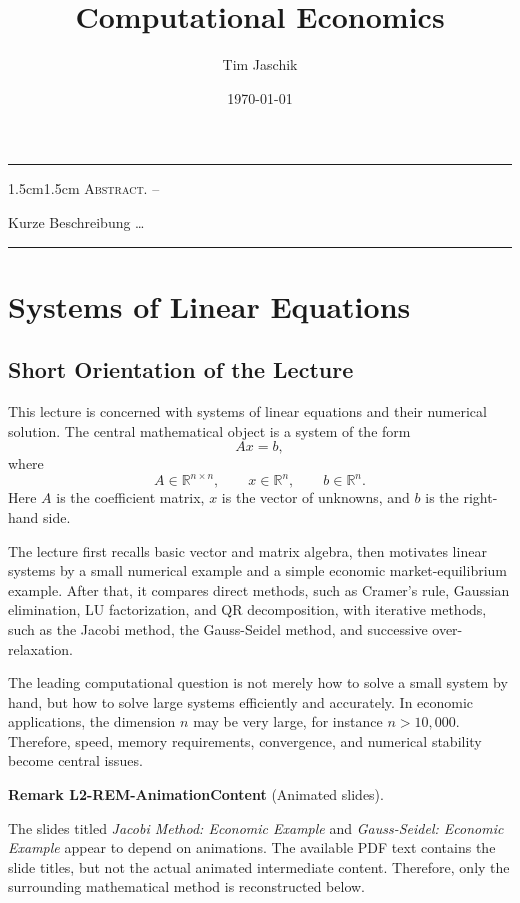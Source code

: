 \documentclass[10pt, letterpaper]{article}
\title{Computational Economics}
\author{Tim Jaschik}
\date{\today}
\newcommand{\R}{\mathbb{R}}
\renewenvironment{abstract}
  {
    \begin{adjustwidth}{1.5cm}{1.5cm}
    \small
    \textsc{Abstract. –}%
  }
  {
    \end{adjustwidth}
  }
\newcommand{\CustomHeading}[3]{%
  \par\medskip\noindent%
  \textbf{#1 #2} \textnormal{(#3)}.\enskip%
}
\newenvironment{REM}[2]{\CustomHeading{Remark}{#1}{#2}}{}
\begin{document}
\maketitle
\rule{\textwidth}{0.5pt}
\begin{abstract}
Kurze Beschreibung …
\end{abstract}
\rule{\textwidth}{0.5pt}
\vspace{0.5cm}

\tableofcontents

\pagebreak



\section{Systems of Linear Equations}

\subsection{Short Orientation of the Lecture}

This lecture is concerned with systems of linear equations and their numerical solution. The central mathematical object is a system of the form
\[
Ax=b,
\]
where
\[
A\in \R^{n\times n},\qquad x\in \R^n,\qquad b\in \R^n.
\]
Here \(A\) is the coefficient matrix, \(x\) is the vector of unknowns, and \(b\) is the right-hand side.

The lecture first recalls basic vector and matrix algebra, then motivates linear systems by a small numerical example and a simple economic market-equilibrium example. After that, it compares direct methods, such as Cramer's rule, Gaussian elimination, LU factorization, and QR decomposition, with iterative methods, such as the Jacobi method, the Gauss-Seidel method, and successive over-relaxation.

The leading computational question is not merely how to solve a small system by hand, but how to solve large systems efficiently and accurately. In economic applications, the dimension \(n\) may be very large, for instance \(n>10{,}000\). Therefore, speed, memory requirements, convergence, and numerical stability become central issues.

\begin{REM}{L2-REM-AnimationContent}{Animated slides}
The slides titled \emph{Jacobi Method: Economic Example} and \emph{Gauss-Seidel: Economic Example} appear to depend on animations. The available PDF text contains the slide titles, but not the actual animated intermediate content. Therefore, only the surrounding mathematical method is reconstructed below.
\end{REM}
\end{document}
